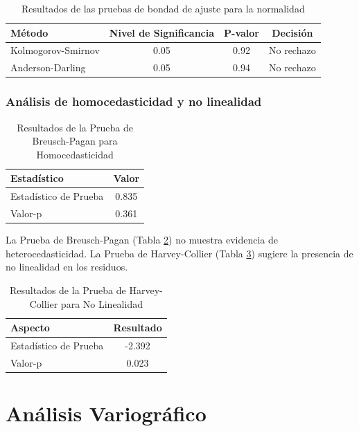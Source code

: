 \begin{table}[ht]
\centering
\caption{Resultados de las pruebas de bondad de ajuste para la normalidad}
\label{tab:goodness_of_fit_tests}
\begin{tabular}{@{}lccc@{}}
\toprule
Método & Nivel de Significancia & P-valor & Decisión \\
\midrule
Kolmogorov-Smirnov & 0.05 & 0.92 & No rechazo \\
Anderson-Darling & 0.05 & 0.94 & No rechazo \\
\bottomrule
\end{tabular}
\end{table}

\subsubsection{Análisis de homocedasticidad y no linealidad}

\begin{table}[H]
\centering
\caption{Resultados de la Prueba de Breusch-Pagan para Homocedasticidad}
\label{tab:breusch_pagan_test}
\begin{tabular}{lc}
\toprule
Estadístico & Valor \\
\midrule
Estadístico de Prueba & 0.835 \\
Valor-p & 0.361 \\
\bottomrule
\end{tabular}
\end{table}

La Prueba de Breusch-Pagan (Tabla \ref{tab:breusch_pagan_test}) no muestra evidencia de heterocedasticidad. La Prueba de Harvey-Collier (Tabla \ref{tab:harvey_collier_test}) sugiere la presencia de no linealidad en los residuos.

\begin{table}[H]
\centering
\caption{Resultados de la Prueba de Harvey-Collier para No Linealidad}
\label{tab:harvey_collier_test}
\begin{tabular}{lc}
\toprule
Aspecto & Resultado \\
\midrule
Estadístico de Prueba & -2.392 \\
Valor-p & 0.023 \\
\bottomrule
\end{tabular}
\end{table}
 

\section{Análisis Variográfico}

